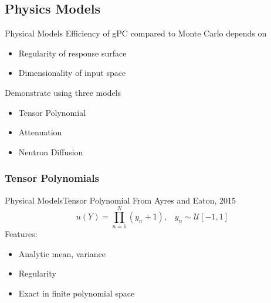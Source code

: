 \documentclass{beamer}
\begin{document}
\subsection{Physics Models}
\begin{frame}{Physical Models}{}\vspace{-20pt}
  \pause
  Efficiency of gPC compared to Monte Carlo depends on
  \begin{itemize}
    \item Regularity of response surface
    \item Dimensionality of input space
  \end{itemize}\vspace{20pt}
  Demonstrate using three models
  \begin{itemize}
    \item Tensor Polynomial
    \item Attenuation
    \item Neutron Diffusion
  \end{itemize}
\end{frame}

\subsubsection{Tensor Polynomials}
\begin{frame}{Physical Models}{Tensor Polynomial}%
  From Ayres and Eaton, 2015
  \begin{equation*}
    u(Y) = \prod_{n=1}^N (y_n+1), \hspace{10pt}y_n\sim\mathcal{U}[-1,1]
  \end{equation*}
  Features:
  \begin{itemize}
    \item Analytic mean, variance
    \item Regularity
    \item Exact in finite polynomial space
  \end{itemize}
\end{frame}
\end{document}
